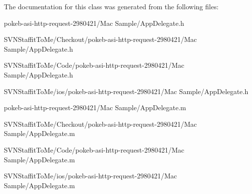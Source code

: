 \-The documentation for this class was generated from the following files\-:\begin{DoxyCompactItemize}
\item 
pokeb-\/asi-\/http-\/request-\/2980421/\-Mac Sample/\-App\-Delegate.\-h\item 
\-S\-V\-N\-Staffit\-To\-Me/\-Checkout/pokeb-\/asi-\/http-\/request-\/2980421/\-Mac Sample/\-App\-Delegate.\-h\item 
\-S\-V\-N\-Staffit\-To\-Me/\-Code/pokeb-\/asi-\/http-\/request-\/2980421/\-Mac Sample/\-App\-Delegate.\-h\item 
\-S\-V\-N\-Staffit\-To\-Me/ios/pokeb-\/asi-\/http-\/request-\/2980421/\-Mac Sample/\-App\-Delegate.\-h\item 
pokeb-\/asi-\/http-\/request-\/2980421/\-Mac Sample/\-App\-Delegate.\-m\item 
\-S\-V\-N\-Staffit\-To\-Me/\-Checkout/pokeb-\/asi-\/http-\/request-\/2980421/\-Mac Sample/\-App\-Delegate.\-m\item 
\-S\-V\-N\-Staffit\-To\-Me/\-Code/pokeb-\/asi-\/http-\/request-\/2980421/\-Mac Sample/\-App\-Delegate.\-m\item 
\-S\-V\-N\-Staffit\-To\-Me/ios/pokeb-\/asi-\/http-\/request-\/2980421/\-Mac Sample/\-App\-Delegate.\-m\end{DoxyCompactItemize}
